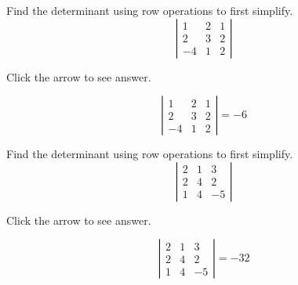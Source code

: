 \documentclass{ximera}
\begin{document}
\begin{problem}\label{prb:7.22} Find the determinant using row operations to first simplify.
\begin{equation*}
\left|
\begin{array}{rrr}
1 & 2 & 1 \\
2 & 3 & 2 \\
-4 & 1 & 2
\end{array}
\right|
\end{equation*}

Click the arrow to see answer.
\begin{expandable}
\[
\left|
\begin{array}{rrr}
1 & 2 & 1 \\
2 & 3 & 2 \\
-4 & 1 & 2
\end{array}
\right| = -6
\]
\end{expandable}
\end{problem}

\begin{problem}\label{prb:7.23} Find the determinant using row operations to first simplify.
\begin{equation*}
\left|
\begin{array}{rrr}
2 & 1 & 3 \\
2 & 4 & 2 \\
1 & 4 & -5
\end{array}
\right|
\end{equation*}

Click the arrow to see answer.
\begin{expandable}
\[
\left|
\begin{array}{rrr}
2 & 1 & 3 \\
2 & 4 & 2 \\
1 & 4 & -5
\end{array}
\right| = -32
\]
\end{expandable}
\end{problem}
\end{document}
